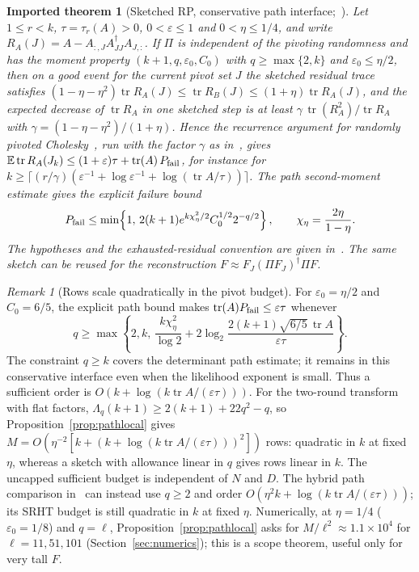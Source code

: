\documentclass[11pt,a4paper]{article}
\newtheorem{imported}[theorem]{Imported theorem}
\theoremstyle{definition}
\theoremstyle{remark}
\newtheorem{remark}[theorem]{Remark}
\numberwithin{equation}{section}
\newcommand{\E}{\mathbb E}
\newcommand{\tr}{\operatorname{tr}}
\newcommand{\eps}{\varepsilon}
\begin{document}
\begin{imported}[Sketched RP, conservative path interface;~\cite{RobustRP}]\label{imp:sketchedrp}
Let $1\le r<k$, $\tau=\tau_r(A)>0$, $0<\eps\le1$ and $0<\eta\le1/4$, and write
$R_A(J)=A-A_{:,J}A_{JJ}^\dagger A_{J,:}$. If $\Pi$ is independent of the
pivoting randomness and has the moment property $(k+1,q,\eps_0,C_0)$ with
$q\ge\max\{2,k\}$ and $\eps_0\le\eta/2$, then on a good event for the current pivot set $J$ the
sketched residual trace satisfies
$(1-\eta-\eta^2)\tr R_A(J)\le\tr R_B(J)\le(1+\eta)\tr R_A(J)$, and the expected
decrease of $\tr R_A$ in one sketched step is at least
$\gamma\,\tr(R_A^2)/\tr R_A$ with $\gamma=(1-\eta-\eta^2)/(1+\eta)$. Hence
the recurrence argument for randomly pivoted Cholesky~\cite{CETW}, run
with the factor $\gamma$ as in~\cite{RobustRP}, gives
$\E\tr R_A(J_k)\le(1+\eps)\tau+\tr(A)\,P_{\rm fail}$, for instance for
$k\ge\lceil(r/\gamma)(\eps^{-1}+\log\eps^{-1}+\log(\tr A/\tau))\rceil$.
The path second-moment estimate gives the explicit failure bound
\[
 P_{\rm fail}\le
 \min\!\left\{1,\,2(k+1)e^{k\chi_\eta^2/2}C_0^{1/2}2^{-q/2}\right\},
 \qquad \chi_\eta=\frac{2\eta}{1-\eta}.
\]
The hypotheses and the exhausted-residual convention are given
in~\cite{RobustRP}. The same sketch can be reused for the
reconstruction $F\approx F_J(\Pi F_J)^\dagger\Pi F$.
\end{imported}

\begin{remark}[Rows scale quadratically in the pivot budget]
For $\eps_0=\eta/2$ and $C_0=6/5$, the explicit path bound makes
$\tr(A)P_{\rm fail}\le\eps\tau$ whenever
\[
 q\ge\max\!\left\{2,k,\,
 \frac{k\chi_\eta^2}{\log2}
 +2\log_2\!\frac{2(k+1)\sqrt{6/5}\,\tr A}{\eps\tau}\right\}.
\]
The constraint $q\ge k$ covers the determinant path estimate;
it remains in this conservative interface even when the likelihood exponent is small.
Thus a sufficient order is $O(k+\log(k\tr A/(\eps\tau)))$.
For the two-round transform with flat factors,
$\Lambda_q(k+1)\ge2(k+1)+22q^2-q$, so Proposition~\ref{prop:pathlocal} gives
$M=O(\eta^{-2}[k+(k+\log(k\tr A/(\eps\tau)))^2])$ rows: quadratic in $k$ at
fixed $\eta$, whereas a sketch with allowance linear in $q$ gives rows linear in
$k$. The uncapped sufficient budget is independent of $N$ and $D$.
The hybrid path comparison in~\cite{RobustRP} can instead use $q\ge2$
and order $O(\eta^2k+\log(k\tr A/(\eps\tau)))$; its SRHT budget is still
quadratic in $k$ at fixed $\eta$. Numerically, at $\eta=1/4$
($\eps_0=1/8$) and $q=\ell$, Proposition~\ref{prop:pathlocal} asks for
$M/\ell^2\approx1.1\times10^4$ for $\ell=11,51,101$
(Section~\ref{sec:numerics}); this is a scope theorem, useful only for very tall $F$.
\end{remark}
\end{document}
